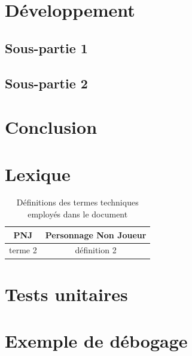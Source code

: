 \documentclass[a4paper,12pt]{article}
\begin{document}
\section{Développement}

\subsection{Sous-partie 1}

\subsection{Sous-partie 2}



\section{Conclusion}



\newpage
\appendix

\section{Lexique}

\begin{table}[h]
    \centering
    \begin{tabular}{c c}
	\toprule
	PNJ		& Personnage Non Joueur \\
	\midrule
	terme 2		& définition 2 \\
	\bottomrule
    \end{tabular}
    \caption{Définitions des termes techniques employés dans le document}
\end{table}



\section{Tests unitaires}
\section{Exemple de débogage}

\end{document}
